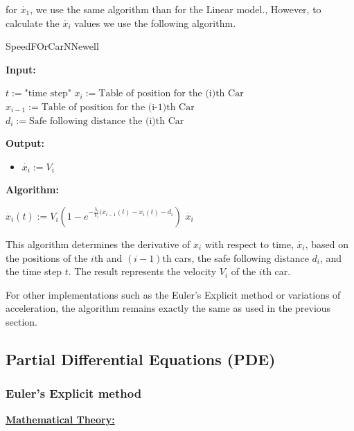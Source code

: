 \documentclass{article}
\begin{document}
		for $\dot{x_1}$, we use the same algorithm than for the Linear model., However, to calculate the $\dot{x_i}$ values we use the following algorithm.
		
		\begin{algorithm}[H]
			\caption{SpeedFOrCarNNewell}\label{alg:xi_dot}
			\begin{algorithmic}
				\State \textbf{Input:} \\
				\begin{itemize}
					\State $t:=\text{"time  step"}$
					\State$x_i:=\text{Table of position for the (i)th Car}$
					\State$x_{i-1}:=\text{Table of position for the (i-1)th Car}$
					\State$d_{i}:=\text{Safe following distance the (i)th Car}$
				\end{itemize}
				\State \textbf{Output:} \\
				\begin{itemize}[]
					\item $\dot{x_i}:=V_i$
				\end{itemize}
				\State \textbf{Algorithm:} \\
				\begin{itemize}[]
					\State $\dot{x_i}(t):=V_i(1-e^{-\frac{\lambda_i}{V_i}(x_{i-1}(t) - x_i(t) - d_i})$ 
					\State \Return $\dot{x_i}$ 
				\end{itemize}		
			\end{algorithmic}
		\end{algorithm}
		This algorithm determines the derivative of $x_i$ with respect to time, $\dot{x_i}$, based on the positions of the $i$th and $(i-1)$th cars, the safe following distance $d_i$, and the time step $t$. The result represents the velocity $V_i$ of the $i$th car. \newline\newline
		
		For other implementations such as the Euler's Explicit method or variations of acceleration, the algorithm remains exactly the same as used in the previous section.
		\newpage
		\subsection{Partial Differential Equations (PDE)}
		
		\subsubsection{Euler's Explicit method}
		
		\textbf{\underline{Mathematical Theory:}} \newline\newline
		
\end{document}
